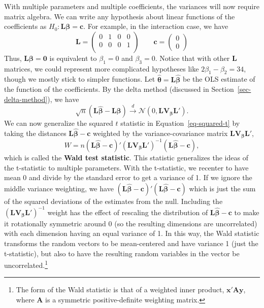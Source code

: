 \documentclass[
  13pt,
  letterpaper,
  DIV=11,
  numbers=noendperiod]{scrreprt}
\newcommand{\bs}{\bm}
\newcommand{\mb}{\bm}
\newcommand{\N}{\mathcal{N}}
\newcommand{\bfbeta}{\mb{\beta}}
\newcommand{\bhat}{\widehat{\mb{\beta}}}
\newcommand{\indist}{\overset{d}{\to}}
\theoremstyle{plain}
\theoremstyle{plain}
\theoremstyle{definition}
\theoremstyle{definition}
\theoremstyle{remark}
\begin{document}
With multiple parameters and multiple coefficients, the variances will
now require matrix algebra. We can write any hypothesis about linear
functions of the coefficients as \(H_{0}: \mb{L}\bfbeta = \mb{c}\). For
example, in the interaction case, we have \[ 
\mb{L} =
\begin{pmatrix}
  0 & 1 & 0 & 0 \\
  0 & 0 & 0 & 1 \\
\end{pmatrix}
\qquad
\mb{c} =
\begin{pmatrix}
  0 \\
  0
\end{pmatrix}
\] Thus, \(\mb{L}\bfbeta = \mb{0}\) is equivalent to \(\beta_1 = 0\) and
\(\beta_3 = 0\). Notice that with other \(\mb{L}\) matrices, we could
represent more complicated hypotheses like \(2\beta_1 - \beta_2 = 34\),
though we mostly stick to simpler functions. Let
\(\widehat{\bs{\theta}} = \mb{L}\bhat\) be the OLS estimate of the
function of the coefficients. By the delta method (discussed in
Section~\ref{sec-delta-method}), we have \[ 
\sqrt{n}\left(\mb{L}\bhat - \mb{L}\bfbeta\right) \indist \N(0, \mb{L}\mb{V}_{\bfbeta}\mb{L}').
\] We can now generalize the squared \(t\) statistic in
Equation~\ref{eq-squared-t} by taking the distances
\(\mb{L}\bhat - \mb{c}\) weighted by the variance-covariance matrix
\(\mb{L}\mb{V}_{\bfbeta}\mb{L}'\), \[ 
W = n(\mb{L}\bhat - \mb{c})'(\mb{L}\mb{V}_{\bfbeta}\mb{L}')^{-1}(\mb{L}\bhat - \mb{c}),
\] which is called the \textbf{Wald test statistic}. This statistic
generalizes the ideas of the t-statistic to multiple parameters. With
the t-statistic, we recenter to have mean 0 and divide by the standard
error to get a variance of 1. If we ignore the middle variance
weighting, we have \((\mb{L}\bhat - \mb{c})'(\mb{L}\bhat - \mb{c})\)
which is just the sum of the squared deviations of the estimates from
the null. Including the \((\mb{L}\mb{V}_{\bfbeta}\mb{L}')^{-1}\) weight
has the effect of rescaling the distribution of \(\mb{L}\bhat - \mb{c}\)
to make it rotationally symmetric around 0 (so the resulting dimensions
are uncorrelated) with each dimension having an equal variance of 1. In
this way, the Wald statistic transforms the random vectors to be
mean-centered and have variance 1 (just the t-statistic), but also to
have the resulting random variables in the vector be
uncorrelated.\footnote{The form of the Wald statistic is that of a
  weighted inner product, \(\mb{x}'\mb{Ay}\), where \(\mb{A}\) is a
  symmetric positive-definite weighting matrix.}
\end{document}

